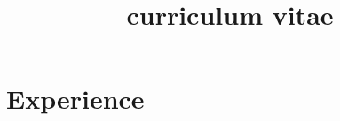 \documentclass[10pt,a4paper,sans]{moderncv}        %
\title{curriculum vitae}                               %
\begin{document}
\makecvtitle







\section{Experience}
\end{document}
